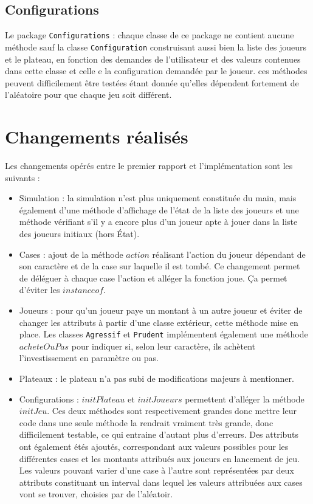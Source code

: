 \documentclass[11pt, a4paper]{report}
\begin{document}
	\section{Configurations}
	
	Le package \verb|Configurations| : chaque classe de ce package ne contient aucune méthode sauf la classe \verb|Configuration| construisant aussi bien la liste des joueurs et le plateau, en fonction des demandes de l'utilisateur et des valeurs contenues dans cette classe et celle e la configuration demandée par le joueur. ces méthodes peuvent difficilement être testées étant donnée qu'elles dépendent fortement de l'aléatoire pour que chaque jeu soit différent.
	
	
	\chapter{Changements réalisés}
	
	Les changements opérés entre le premier rapport et l'implémentation sont les suivants :
	
	\begin{itemize}
		\item Simulation : la simulation n'est plus uniquement constituée du main, mais également d'une méthode d'affichage de l'état de la liste des joueurs et une méthode vérifiant s'il y a encore plus d'un joueur apte à jouer dans la liste des joueurs initiaux (hors État).
		 
		\item Cases : ajout de la méthode $action$ réalisant l'action du joueur dépendant de son caractère et de la case sur laquelle il est tombé. Ce changement permet de déléguer à chaque case l'action et alléger la fonction joue. Ça permet d'éviter les $instanceof$.
		
		\item Joueurs : pour qu'un joueur paye un montant à un autre joueur et éviter de changer les attributs à partir d'une classe extérieur, cette méthode mise en place.
		Les classes \verb*|Agressif| et \verb*|Prudent| implémentent également une méthode $acheteOuPas$ pour indiquer si, selon leur caractère, ils achètent l'investissement en paramètre ou pas.
		
		\item Plateaux : le plateau n'a pas subi de modifications majeurs à mentionner.
		
		\item Configurations : $initPlateau$ et $initJoueurs$ permettent d'alléger la méthode $initJeu$. Ces deux méthodes sont respectivement grandes donc mettre leur code dans une seule méthode la rendrait vraiment très grande, donc difficilement testable, ce qui entraine d'autant plus d'erreurs.
		Des attributs ont également étés ajoutés, correspondant aux valeurs possibles pour les différentes cases et les montants attribués aux joueurs en lancement de jeu. Les valeurs pouvant varier d'une case à l'autre sont représentées par deux attributs constituant un interval dans lequel les valeurs attribuées aux cases vont se trouver, choisies par de l'aléatoir.
		
	\end{itemize}
\end{document}
